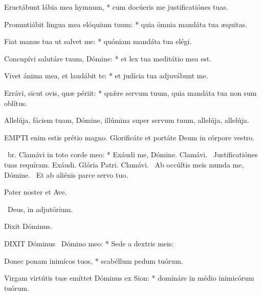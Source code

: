 Eructábunt lábia mea hymnum, * cum docúeris me justificatiónes tuas.

Pronuntiábit lingua mea elóquium tuum: * quia ómnia mandáta tua æquitas.

Fiat manus tua ut salvet me: * quóniam mandáta tua elégi.

Concupívi salutáre tuum, Dómine: * et lex tua meditátio mea est.

Vivet ánima mea, et laudábit te: * et judícia tua adjuvábunt me.

Errávi, sicut ovis, quæ périit: * quǽre servum tuum, quia mandáta tua non sum oblítus.


 Allelúja, fáciem tuam, Dómine, illúmina super servum tuum, allelúja, allelúja.


\lettrine[lines=2]{E}{MPTI} enim estis prétio magno. Glorificáte et portáte Deum in córpore vestro.

\R\ br. Clamávi in toto corde meo: * Exáudi me, Dómine. Clamávi. \V\ Justificatiónes tuas requíram. Exáudi. Glória Patri. Clamávi. \V\ Ab occúltis meis munda me, Dómine. \R\ Et ab aliénis parce servo tuo.



\sectionornament


Pater noster et Ave.

\V\ Deus, in adjutórium.


  Dixit Dóminus. \textdagger



\lettrine[lines=2]{D}{IXIT} Dóminus \textdagger\ Dómino meo: * Sede a dextris meis:

Donec ponam inimícos tuos, * scabéllum pedum tuórum.

Virgam virtútis tuæ emíttet Dóminus ex Sion: * domináre in médio inimicórum tuórum.

